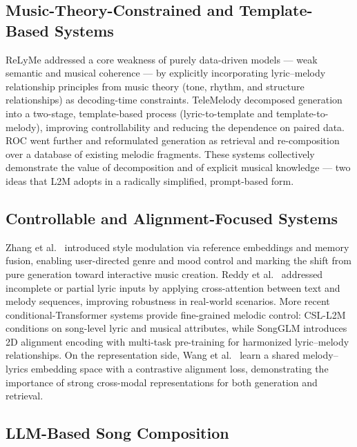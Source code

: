 \subsection{Music-Theory-Constrained and Template-Based Systems}

ReLyMe \cite{zhang22relyme} addressed a core weakness of purely data-driven
models --- weak semantic and musical coherence --- by explicitly
incorporating lyric--melody relationship principles from music theory (tone,
rhythm, and structure relationships) as decoding-time constraints.
TeleMelody \cite{ju22telemelody} decomposed generation into a two-stage,
template-based process (lyric-to-template and template-to-melody), improving
controllability and reducing the dependence on paired data. ROC
\cite{lv22roc} went further and reformulated generation as retrieval and
re-composition over a database of existing melodic fragments. These systems
collectively demonstrate the value of decomposition and of explicit musical
knowledge --- two ideas that L2M adopts in a radically simplified, prompt-based
form.

\subsection{Controllable and Alignment-Focused Systems}

Zhang et al.~\cite{zhang23controllable} introduced style modulation via
reference embeddings and memory fusion, enabling user-directed genre and
mood control and marking the shift from pure generation toward interactive
music creation. Reddy et al.~\cite{reddy23attention} addressed incomplete or
partial lyric inputs by applying cross-attention between text and melody
sequences, improving robustness in real-world scenarios. More recent
conditional-Transformer systems provide fine-grained melodic control:
CSL-L2M \cite{chai24csll2m} conditions on song-level lyric and musical
attributes, while SongGLM \cite{yu24songglm} introduces 2D alignment
encoding with multi-task pre-training for harmonized lyric--melody
relationships. On the representation side, Wang et
al.~\cite{wang25melodylyrics} learn a shared melody--lyrics embedding space
with a contrastive alignment loss, demonstrating the importance of strong
cross-modal representations for both generation and retrieval.

\subsection{LLM-Based Song Composition}

